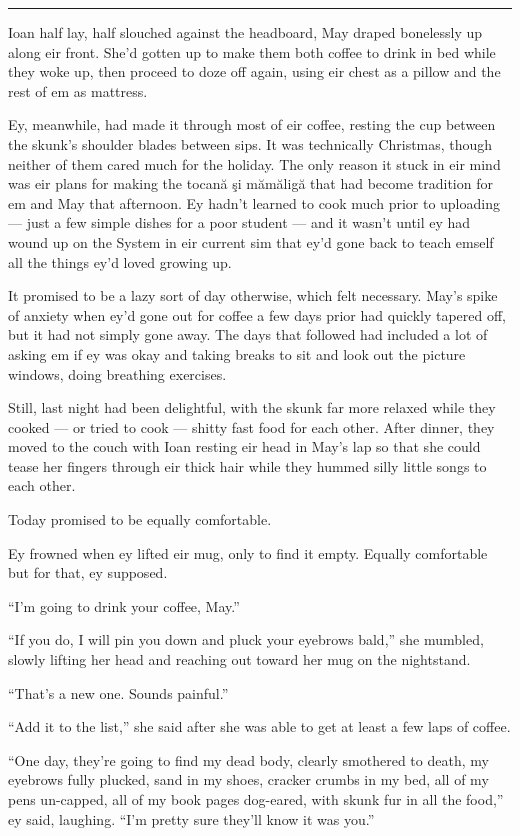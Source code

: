 \begin{center}\rule{0.5\linewidth}{0.5pt}\end{center}

Ioan half lay, half slouched against the headboard, May draped bonelessly up along eir front. She'd gotten up to make them both coffee to drink in bed while they woke up, then proceed to doze off again, using eir chest as a pillow and the rest of em as mattress.

Ey, meanwhile, had made it through most of eir coffee, resting the cup between the skunk's shoulder blades between sips. It was technically Christmas, though neither of them cared much for the holiday. The only reason it stuck in eir mind was eir plans for making the tocană şi mămăligă that had become tradition for em and May that afternoon. Ey hadn't learned to cook much prior to uploading — just a few simple dishes for a poor student — and it wasn't until ey had wound up on the System in eir current sim that ey'd gone back to teach emself all the things ey'd loved growing up.

It promised to be a lazy sort of day otherwise, which felt necessary. May's spike of anxiety when ey'd gone out for coffee a few days prior had quickly tapered off, but it had not simply gone away. The days that followed had included a lot of asking em if ey was okay and taking breaks to sit and look out the picture windows, doing breathing exercises.

Still, last night had been delightful, with the skunk far more relaxed while they cooked — or tried to cook — shitty fast food for each other. After dinner, they moved to the couch with Ioan resting eir head in May's lap so that she could tease her fingers through eir thick hair while they hummed silly little songs to each other.

Today promised to be equally comfortable.

Ey frowned when ey lifted eir mug, only to find it empty. Equally comfortable but for that, ey supposed.

``I'm going to drink your coffee, May.''

``If you do, I will pin you down and pluck your eyebrows bald,'' she mumbled, slowly lifting her head and reaching out toward her mug on the nightstand.

``That's a new one. Sounds painful.''

``Add it to the list,'' she said after she was able to get at least a few laps of coffee.

``One day, they're going to find my dead body, clearly smothered to death, my eyebrows fully plucked, sand in my shoes, cracker crumbs in my bed, all of my pens un-capped, all of my book pages dog-eared, with skunk fur in all the food,'' ey said, laughing. ``I'm pretty sure they'll know it was you.''

